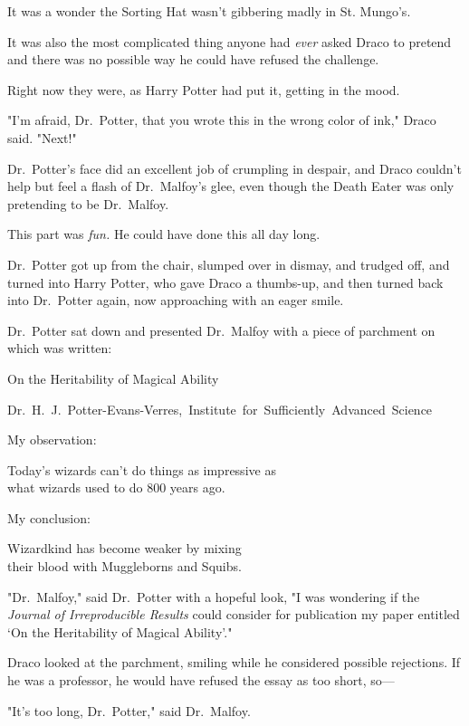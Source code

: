 It was a wonder the Sorting Hat wasn't gibbering madly in St. Mungo's.

It was also the most complicated thing anyone had \emph{ever} asked Draco to
pretend and there was no possible way he could have refused the challenge.

Right now they were, as Harry Potter had put it, getting in the mood.

"I'm afraid, Dr.~Potter, that you wrote this in the wrong color of ink," Draco
said. "Next!"

Dr.~Potter's face did an excellent job of crumpling in despair, and Draco
couldn't help but feel a flash of Dr.~Malfoy's glee, even though the Death
Eater was only pretending to be Dr.~Malfoy.

This part was \emph{fun.} He could have done this all day long.

Dr.~Potter got up from the chair, slumped over in dismay, and trudged off, and
turned into Harry Potter, who gave Draco a thumbs-up, and then turned back into
Dr.~Potter again, now approaching with an eager smile.

Dr.~Potter sat down and presented Dr.~Malfoy with a piece of parchment on which
was written:

\begin{onTheHeritability}
    On the Heritability of Magical Ability

    \mbox{Dr.~H.~J. Potter-Evans-Verres, Institute for Sufficiently Advanced
    Science}

    My observation:

    Today's wizards can't do things as impressive as\\
    what wizards used to do 800 years ago.

    My conclusion:

    Wizardkind has become weaker by mixing\\
    their blood with Muggleborns and Squibs.
\end{onTheHeritability}

"Dr.~Malfoy," said Dr.~Potter with a hopeful look, "I was wondering if the
\emph{Journal of Irreproducible Results} could consider for publication my
paper entitled `On the Heritability of Magical Ability'."

Draco looked at the parchment, smiling while he considered possible rejections.
If he was a professor, he would have refused the essay as too short, so---

"It's too long, Dr.~Potter," said Dr.~Malfoy.

